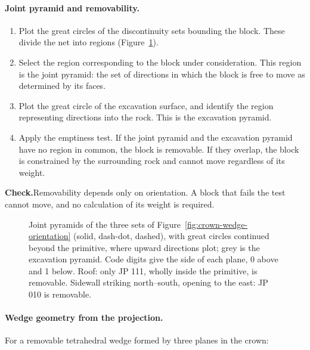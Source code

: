 \paragraph{Joint pyramid and removability.}

\begin{enumerate}
  \item Plot the great circles of the discontinuity sets bounding the block.
        These divide the net into regions (Figure~\ref{fig:joint-pyramid}).
  \item Select the region corresponding to the block under consideration.
        This region is the joint pyramid: the set of directions in which the
        block is free to move as determined by its faces.
  \item Plot the great circle of the excavation surface, and identify the
        region representing directions into the rock. This is the excavation
        pyramid.
  \item Apply the emptiness test. If the joint pyramid and the excavation
        pyramid have no region in common, the block is removable. If they
        overlap, the block is constrained by the surrounding rock and cannot
        move regardless of its weight.
\end{enumerate}

\noindent\textbf{Check.}\enspace Removability depends only on orientation. A
block that fails the test cannot move, and no calculation of its weight is
required.

\begin{figure}[htbp]
\centering
{}
\caption{Joint pyramids of the three sets of Figure~\ref{fig:crown-wedge-orientation} (solid, dash-dot, dashed), with great circles continued beyond the primitive, where upward directions plot; grey is the excavation pyramid. Code digits give the side of each plane, 0 above and 1 below. Roof: only JP 111, wholly inside the primitive, is removable. Sidewall striking north--south, opening to the east: JP 010 is removable.}
\label{fig:joint-pyramid}
\end{figure}

\paragraph{Wedge geometry from the projection.}
For a removable tetrahedral wedge formed by three planes in the crown:

